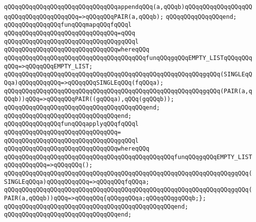\verb|qQQqqQQqqQQqqQQqqQQqqQQqqQQqqQQqappendqQQq(a,qQQqb)qQQqqQQqqQQqqQQqqQQqqQQqqQQqqQQqqQQqqQQq=>qQQqqQQqPAIR(a,qQQqb);|\newline
\verb|qQQqqQQqqQQqqQQqend;|\newline
\newline
\verb|qQQqqQQqqQQqqQQqfunqQQqmapqQQqfqQQql|\newline
\verb|qQQqqQQqqQQqqQQqqQQqqQQqqQQqqQQq=qQQq|\newline
\verb|qQQqqQQqqQQqqQQqqQQqqQQqqQQqqQQqgqQQql|\newline
\verb|qQQqqQQqqQQqqQQqqQQqqQQqqQQqqQQqwhereqQQq|\newline
\newline
\verb|qQQqqQQqqQQqqQQqqQQqqQQqqQQqqQQqqQQqqQQqfunqQQqgqQQqEMPTY_LISTqQQqqQQqqQQq=>qQQqqQQqEMPTY_LIST;|\newline
\verb|qQQqqQQqqQQqqQQqqQQqqQQqqQQqqQQqqQQqqQQqqQQqqQQqqQQqqQQqgqQQq(SINGLEqQQqa)qQQqqQQqqQQq=>qQQqqQQqSINGLEqQQq(fqQQqa);|\newline
\verb|qQQqqQQqqQQqqQQqqQQqqQQqqQQqqQQqqQQqqQQqqQQqqQQqqQQqqQQqgqQQq(PAIR(a,qQQqb))qQQq=>qQQqqQQqPAIR((gqQQqa),qQQq(gqQQqb));|\newline
\verb|qQQqqQQqqQQqqQQqqQQqqQQqqQQqqQQqqQQqqQQqend;|\newline
\verb|qQQqqQQqqQQqqQQqqQQqqQQqqQQqqQQqend;|\newline
\newline
\verb|qQQqqQQqqQQqqQQqfunqQQqapplyqQQqfqQQql|\newline
\verb|qQQqqQQqqQQqqQQqqQQqqQQqqQQqqQQq=|\newline
\verb|qQQqqQQqqQQqqQQqqQQqqQQqqQQqqQQqgqQQql|\newline
\verb|qQQqqQQqqQQqqQQqqQQqqQQqqQQqqQQqwhereqQQq|\newline
\newline
\verb|qQQqqQQqqQQqqQQqqQQqqQQqqQQqqQQqqQQqqQQqqQQqqQQqfunqQQqgqQQqEMPTY_LISTqQQqqQQqqQQq=>qQQqqQQq();|\newline
\verb|qQQqqQQqqQQqqQQqqQQqqQQqqQQqqQQqqQQqqQQqqQQqqQQqqQQqqQQqqQQqqQQqgqQQq(SINGLEqQQqa)qQQqqQQqqQQq=>qQQqqQQqfqQQqa;|\newline
\verb|qQQqqQQqqQQqqQQqqQQqqQQqqQQqqQQqqQQqqQQqqQQqqQQqqQQqqQQqqQQqqQQqgqQQq(PAIR(a,qQQqb))qQQq=>qQQqqQQq{qQQqgqQQqa;qQQqqQQqgqQQqb;};|\newline
\verb|qQQqqQQqqQQqqQQqqQQqqQQqqQQqqQQqqQQqqQQqqQQqqQQqend;|\newline
\verb|qQQqqQQqqQQqqQQqqQQqqQQqqQQqqQQqend;|\newline
\newline
